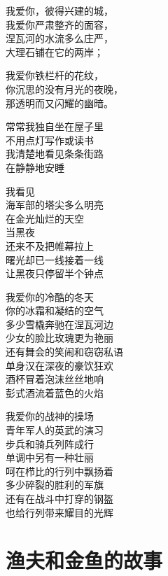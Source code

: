 \documentclass[]{book}
\renewenvironment{quote}{\begin{VF}}{\end{VF}}
\begin{document}
\begin{quote}
我爱你，彼得兴建的城，\\
我爱你严肃整齐的面容，\\
涅瓦河的水流多么庄严，\\
大理石铺在它的两岸；

我爱你铁栏杆的花纹，\\
你沉思的没有月光的夜晚，\\
那透明而又闪耀的幽暗。

常常我独自坐在屋子里\\
不用点灯写作或读书\\
我清楚地看见条条街路\\
在静静地安睡

我看见\\
海军部的塔尖多么明亮\\
在金光灿烂的天空\\
当黑夜\\
还来不及把帷幕拉上\\
曙光却已一线接着一线\\
让黑夜只停留半个钟点

我爱你的冷酷的冬天\\
你的冰霜和凝结的空气\\
多少雪橇奔驰在涅瓦河边\\
少女的脸比玫瑰更为艳丽\\
还有舞会的笑闹和窃窃私语\\
单身汉在深夜的豪饮狂欢\\
酒杯冒着泡沫丝丝地响\\
彭式酒流着蓝色的火焰

我爱你的战神的操场\\
青年军人的英武的演习\\
步兵和骑兵列阵成行\\
单调中另有一种壮丽\\
呵在栉比的行列中飘扬着\\
多少碎裂的胜利的军旗\\
还有在战斗中打穿的钢盔\\
也给行列带来耀目的光辉
\end{quote}

\section{渔夫和金鱼的故事}
\end{document}
